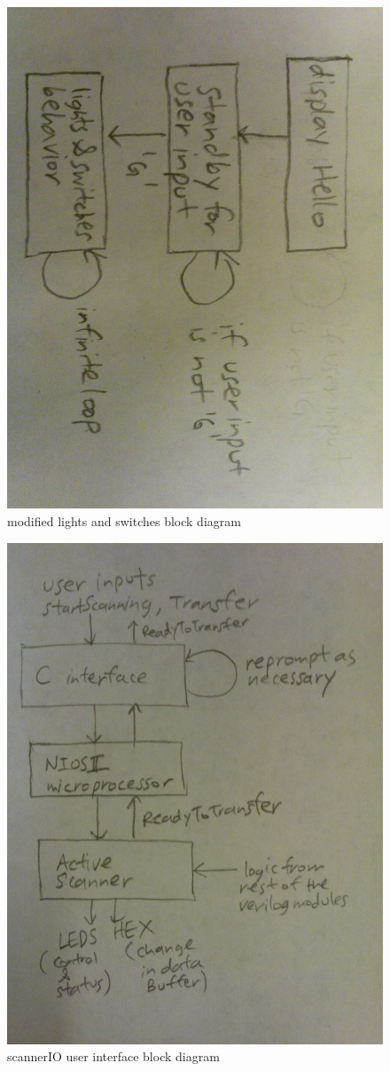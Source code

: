 \documentclass{article}
\begin{document}
      \begin{figure}[H]
        \centering
        \includegraphics[width=0.75\linewidth]{figures/block_diagrams/lab4_lightsandswitchesmod_blockdiagram.jpg}
        \caption{modified lights and switches block diagram}
        \label{fig:ligthsandswitchesmod_blockdiagram}
      \end{figure}

      \begin{figure}[H]
        \centering
        \includegraphics[width=0.75\linewidth]{figures/block_diagrams/lab4_scannerIO_blockdiagram.jpg}
        \caption{scannerIO user interface block diagram}
        \label{fig:scannerIO_blockdiagram}
      \end{figure}
\end{document}
